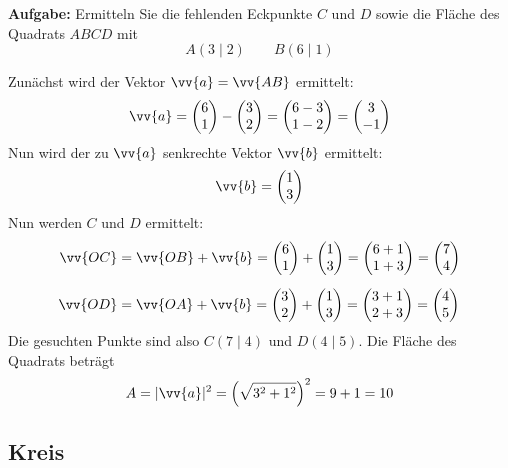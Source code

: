 \textbf{Aufgabe:} Ermitteln Sie die fehlenden Eckpunkte $C$ und $D$ sowie die Fläche des Quadrats $ABCD$ mit
\[
  A(3\mid 2) \qquad B(6\mid 1)
\]
\begin{center}
\end{center}
Zunächst wird der Vektor $\vv{a} = \vv{AB}$ ermittelt:
\[
  \vv{a} = \vxy{6}{1}-\vxy{3}{2} = \vxy{6-3}{1-2} = \vxy{3}{-1}
\]
Nun wird der zu $\vv{a}$ senkrechte Vektor $\vv{b}$ ermittelt:
\[
  \vv{b} = \vxy{1}{3}
\]
Nun werden $C$ und $D$ ermittelt:
\begin{align*}
  \vv{OC} &= \vv{OB}+\vv{b} = \vxy{6}{1} + \vxy{1}{3} = \vxy{6+1}{1+3} = \vxy{7}{4} \\[2mm]
  \vv{OD} &= \vv{OA}+\vv{b} = \vxy{3}{2} + \vxy{1}{3} = \vxy{3+1}{2+3} = \vxy{4}{5}
\end{align*}
Die gesuchten Punkte sind also $C(7\mid 4)$ und $D(4\mid 5)$. Die Fläche des Quadrats beträgt
\[
  A = |\vv{a}|^{2} = \left(\sqrt{3^{2}+1^{2}}\right)^{2} = 9+1 = 10
\]


\newpage
\subsection{Kreis}

